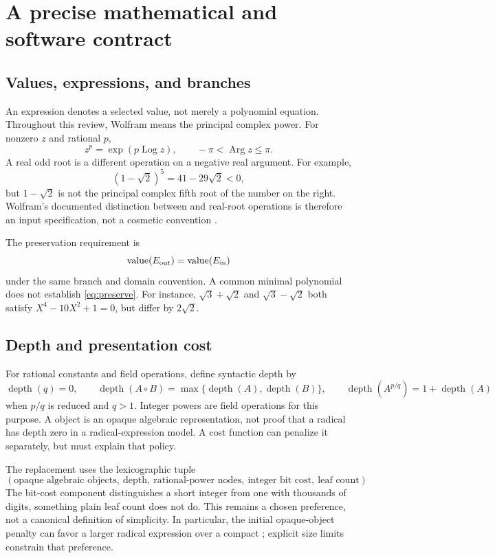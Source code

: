\documentclass[11pt,letterpaper]{article}
\numberwithin{equation}{section}
\theoremstyle{definition}\newtheorem{definition}[theorem]{Definition}
\theoremstyle{remark}\newtheorem{remark}[theorem]{Remark}
\newcommand{\depth}{\operatorname{depth}}
\newcommand{\code}[1]{\texttt{\detokenize{#1}}}
\begin{document}
\section{A precise mathematical and software contract}
\label{sec:contract}

\subsection{Values, expressions, and branches}
An expression denotes a selected value, not merely a polynomial equation. Throughout this review, Wolfram \code{Power} means the principal complex power. For nonzero $z$ and rational $p$,
\[
 z^p=\exp(p\operatorname{Log}z),\qquad -\pi<\operatorname{Arg}z\le\pi.
\]
A real odd root is a different operation on a negative real argument. For example,
\[
 (1-\sqrt2)^5=41-29\sqrt2<0,
\]
but $1-\sqrt2$ is not the principal complex fifth root of the number on the right. Wolfram's documented distinction between \code{Power} and real-root operations is therefore an input specification, not a cosmetic convention \cite{wl-power}.

The preservation requirement is
\begin{equation}\label{eq:preserve}
 \operatorname{value}(E_{\rm out})=\operatorname{value}(E_{\rm in})
\end{equation}
under the same branch and domain convention. A common minimal polynomial does not establish \eqref{eq:preserve}. For instance, $\sqrt3+\sqrt2$ and $\sqrt3-\sqrt2$ both satisfy $X^4-10X^2+1=0$, but differ by $2\sqrt2$.

\subsection{Depth and presentation cost}
For rational constants and field operations, define syntactic depth by
\[
 \depth(q)=0,\qquad
 \depth(A\circ B)=\max\{\depth(A),\depth(B)\},
 \qquad \depth(A^{p/q})=1+\depth(A)
\]
when $p/q$ is reduced and $q>1$. Integer powers are field operations for this purpose. A \code{Root} object is an opaque algebraic representation, not proof that a radical has depth zero in a radical-expression model. A cost function can penalize it separately, but must explain that policy.

The replacement uses the lexicographic tuple
\begin{equation}\label{eq:cost}
 (\text{opaque algebraic objects},\ \text{depth},\
   \text{rational-power nodes},\ \text{integer bit cost},\ \text{leaf count}).
\end{equation}
The bit-cost component distinguishes a short integer from one with thousands of digits, something plain leaf count does not do. This remains a chosen preference, not a canonical definition of simplicity. In particular, the initial opaque-object penalty can favor a larger radical expression over a compact \code{Root}; explicit size limits constrain that preference.
\end{document}
